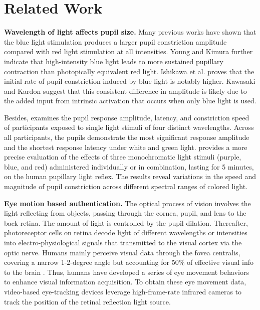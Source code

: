 \documentclass[sigconf]{acmart}
\begin{document}
\section{Related Work}
\label{sec:Related}

\noindent \textbf{Wavelength of light affects pupil size.}
Many previous works \cite{do2010intrinsically, herbst2011test, Kardon2009} have shown that the blue light stimulation produces a larger pupil constriction amplitude compared with red light stimulation at all intensities. Young and Kimura \cite{YOUNG2008862} further indicate that high-intensity blue light leads to more sustained pupillary contraction than photopically equivalent red light. Ishikawa et al. \cite{ishikawa2012effects} proves that the initial rate of pupil constriction induced by blue light is notably higher. Kawasaki and Kardon \cite{do2010intrinsically,Kardon2009} suggest that this consistent difference in amplitude is likely due to the added input from intrinsic activation that occurs when only blue light is used. 

Besides, \cite{lobato2014pupillary} examines the pupil response amplitude, latency, and constriction speed of participants exposed to single light stimuli of four distinct wavelengths. Across all participants, the pupils demonstrate the most significant response amplitude and the shortest response latency under white and green light. \cite{Bonmati_fneur201801019} provides a more precise evaluation of the effects of three monochromatic light stimuli (purple, blue, and red) administered individually or in combination, lasting for 5 minutes, on the human pupillary light reflex. The results reveal variations in the speed and magnitude of pupil constriction across different spectral ranges of colored light.

\noindent \textbf{Eye motion based authentication.}
The optical process of vision involves the light reflecting from objects, passing through the cornea, pupil, and lens to the back retina. The amount of light is controlled by the pupil dilation. Thereafter, photoreceptor cells on retina decode light of different wavelengths or intensities into electro-physiological signals that transmitted to the visual cortex via the optic nerve. Humans mainly perceive visual data through the fovea centralis, covering a narrow 1-2-degree angle but accounting for 50\% of effective visual info to the brain \cite{Visual_Ss}. Thus, humans have developed a series of eye movement behaviors to enhance visual information acquisition.
To obtain these eye movement data, video-based eye-tracking devices leverage high-frame-rate infrared cameras to track the position of the retinal reflection light source.
\end{document}
